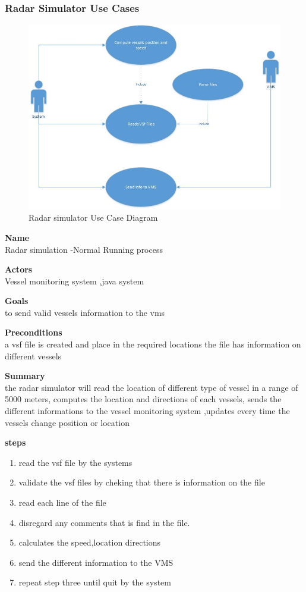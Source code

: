 \documentclass{article}
\begin{document}
\subsubsection{ Radar Simulator Use Cases}
\begin{figure}[h]
\caption{Radar simulator Use Case Diagram}
\includegraphics[width=\linewidth]{usecasediagram}
\end{figure}

\noindent
{\bf Name}\\
Radar simulation -Normal Running process

\noindent
{\bf Actors}\\
Vessel monitoring system ,java system

\noindent
{\bf Goals}\\
to send valid vessels information to the vms 

\noindent
{\bf Preconditions }\\
a vsf  file is created and place in the required locations 
the file has information on different vessels

\noindent
{\bf Summary }\\
the radar simulator will read the location of different type of vessel in a range of 5000 meters,
computes the location and directions of each vessels, 
sends the different informations to the vessel monitoring system ,updates every time the vessels  
change position or location

\noindent
{\bf steps }\\ 
\begin{enumerate}
\item  read  the vsf file  by the systems 
\item validate the vsf files by cheking that there is information on the file 
\item read each line of the file 
\item disregard any comments that is find in the file.
\item calculates the speed,location directions
\item send the different information to the VMS
\item repeat step three until quit by the system
\end{enumerate} 
\end{document}

